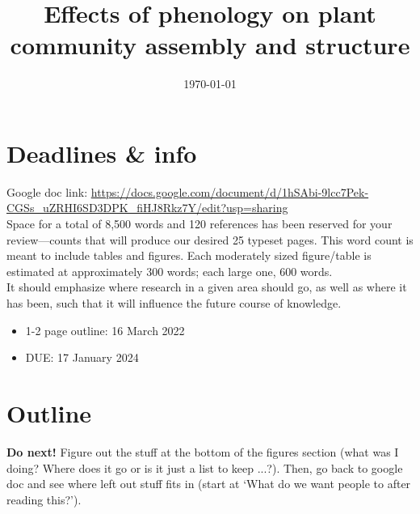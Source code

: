 \documentclass[11pt,letter]{article}
\begin{document}

\renewcommand{\refname}{\CHead{}}

\title{Effects of phenology on plant community assembly and structure }
\author{}
\date{\today}
\maketitle
\tableofcontents

\section{Deadlines \& info}
Google doc link: \url{https://docs.google.com/document/d/1hSAbi-9lcc7Pek-CGSs_uZRHI6SD3DPK_fiHJ8Rkz7Y/edit?usp=sharing}\\

Space for a total of 8,500 words and 120 references has been reserved for your review—counts that will produce our desired 25 typeset pages. This word count is meant to include tables and figures. Each moderately sized figure/table is estimated at approximately 300 words; each large one, 600 words.\\

It should emphasize where research in a given area should go, as well as where it has been, such that it will influence the future course of knowledge. 

\begin{itemize}
\item 1-2 page outline: 16 March 2022 %
\item DUE: 17 January 2024
\end{itemize}

\section{Outline}
{\bf \Large Do next!} Figure out the stuff at the bottom of the figures section (what was I doing? Where does it go or is it just a list to keep ...?). Then, go back to google doc and see where left out stuff fits in (start at `What do we want people to after reading this?'). 
\end{document}
